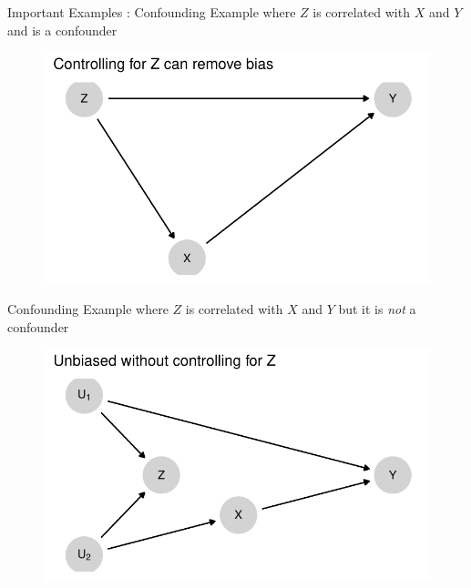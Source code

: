 \documentclass[
  11pt,
  ignorenonframetext,
]{beamer}
\begin{document}
\begin{frame}{Important Examples : Confounding}
\protect\hypertarget{important-examples-confounding}{}
Example where \(Z\) is correlated with \(X\) and \(Y\) and is a
confounder

\begin{figure}

{\centering \includegraphics{0_lectures_files/figure-beamer/unnamed-chunk-245-1.pdf}

}

\end{figure}
\end{frame}

\begin{frame}{Confounding}
\protect\hypertarget{confounding}{}
Example where \(Z\) is correlated with \(X\) and \(Y\) but it is
\emph{not} a confounder

\begin{figure}

{\centering \includegraphics{0_lectures_files/figure-beamer/unnamed-chunk-246-1.pdf}

}

\end{figure}
\end{frame}
\end{document}
